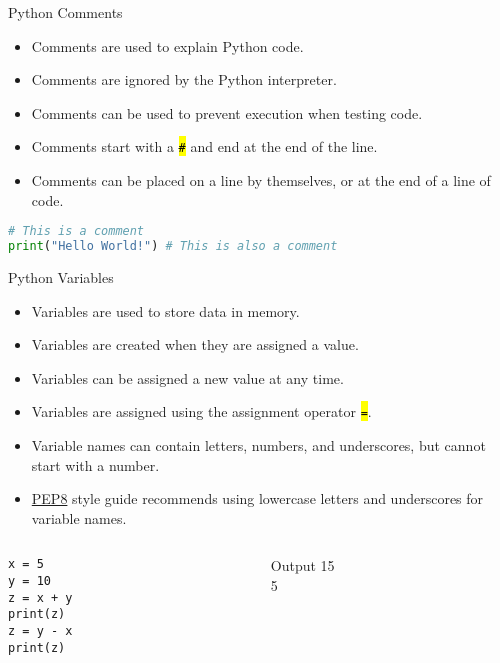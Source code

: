 \documentclass[
    aspectratio=169, 
    usepdftitle=false, 
    xcolor={dvipsnames},
    hyperref={
        colorlinks,
        linkcolor=black,
        urlcolor=blue}
    ]{beamer}
\let\OldTexttt\texttt
\renewcommand{\texttt}[1]{\OldTexttt{\hl{#1}}}%
\begin{document}
\begin{frame}[fragile]{Python Comments}
    \begin{itemize}
        \item Comments are used to explain Python code.
        \item Comments are ignored by the Python interpreter.
        \item Comments can be used to prevent execution when testing code.
        \item Comments start with a \texttt{\#} and end at the end of the line.
        \item Comments can be placed on a line by themselves, or at the end of a line of code.
    \end{itemize}
    \begin{lstlisting}[language=Python]
# This is a comment
print("Hello World!") # This is also a comment
    \end{lstlisting}
\end{frame}


\begin{frame}[fragile]{Python Variables}
    \begin{itemize}
        \item Variables are used to store data in memory.
        \item Variables are created when they are assigned a value.
        \item Variables can be assigned a new value at any time.
        \item Variables are assigned using the assignment operator \texttt{=}.
        \item Variable names can contain letters, numbers, and underscores, but cannot start with a number.
        \item \href{https://peps.python.org/pep-0008/}{PEP8} style guide recommends using lowercase letters and underscores for variable names.
    \end{itemize}
    \begin{columns}
        \begin{column}{0.5\textwidth}
            \begin{lstlisting}
x = 5
y = 10
z = x + y
print(z)
z = y - x
print(z)
    \end{lstlisting}
        \end{column}
        \begin{column}{0.4\textwidth}
            \begin{block}{Output}
                15\\
                5
            \end{block}
        \end{column}
    \end{columns}
\end{frame}
\end{document}
